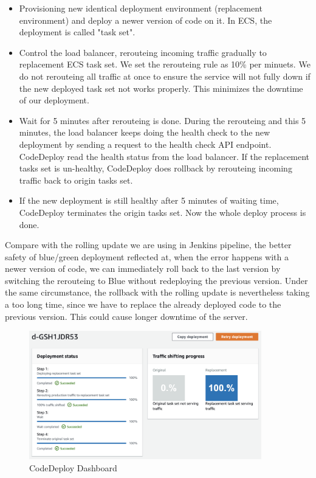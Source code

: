 \begin{itemize}
 \item Provisioning new identical deployment environment (replacement environment) and deploy a newer version of code on it. In ECS, the deployment is called "task set".
 \item Control the load balancer, rerouteing incoming traffic gradually to replacement ECS task set. We set the rerouteing rule as 10\% per minuets. We do not rerouteing all traffic at once to ensure the service will not fully down if the new deployed task set not works properly. This minimizes the downtime of our deployment.
 \item Wait for 5 minutes after rerouteing is done. During the rerouteing and this 5 minutes, the load balancer keeps doing the health check to the new deployment by sending a request to the health check API endpoint. CodeDeploy read the health status from the load balancer. If the replacement tasks set is un-healthy, CodeDeploy does rollback by rerouteing incoming traffic back to origin tasks set.
 \item If the new deployment is still healthy after 5 minutes of waiting time, CodeDeploy terminates the origin tasks set. Now the whole deploy process is done.
\end{itemize}
Compare with the rolling update we are using in Jenkins pipeline, the better safety of blue/green deployment reflected at, when the error happens with a newer version of code, we can immediately roll back to the last version by switching the rerouteing to Blue \cite{UsingBlu65:online} without redeploying the previous version. Under the same circumstance, the rollback with the rolling update is nevertheless taking a too long time, since we have to replace the already deployed code to the previous version. This could cause longer downtime of the server. 
\begin{figure}[h]
 \centering
 \includegraphics[width=0.90\textwidth]{pics/codedeploy_steps.png}
 \caption{CodeDeploy Dashboard}
 \label{fig:codedeploy_steps}
\end{figure}
